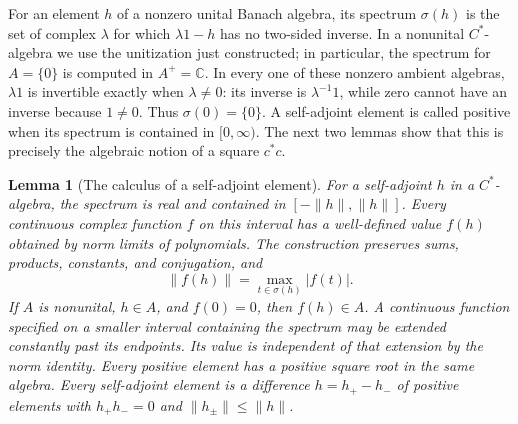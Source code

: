 \documentclass[11pt]{article}
\newtheorem{lemma}[theorem]{Lemma}
\theoremstyle{definition}
\theoremstyle{remark}
\numberwithin{equation}{section}
\newcommand{\C}{\mathbb C}
\begin{document}
For an element $h$ of a nonzero unital Banach algebra, its spectrum $\sigma(h)$
is the set of complex $\lambda$ for which $\lambda1-h$ has no two-sided
inverse.  In a nonunital $C^*$-algebra we use the unitization just constructed;
in particular, the spectrum for $A=\{0\}$ is computed in $A^+=\C$.
In every one of these nonzero ambient algebras, $\lambda1$ is invertible
exactly when $\lambda\ne0$: its inverse is $\lambda^{-1}1$, while zero
cannot have an inverse because $1\ne0$.  Thus $\sigma(0)=\{0\}$.
A self-adjoint element is called positive when its spectrum is contained in
$[0,\infty)$.  The next two lemmas show that this is precisely the algebraic
notion of a square $c^*c$.

\begin{lemma}[The calculus of a self-adjoint element]
\label{lem:cstar-calculus}
For a self-adjoint $h$ in a $C^*$-algebra, the spectrum is real and contained
in $[-\|h\|,\|h\|]$.  Every continuous complex function $f$ on this interval
has a well-defined value $f(h)$ obtained by norm limits of polynomials.
The construction preserves sums, products, constants, and conjugation, and
\[
 \|f(h)\|=\max_{t\in\sigma(h)}|f(t)|.
\]
If $A$ is nonunital, $h\in A$, and $f(0)=0$, then $f(h)\in A$.
A continuous function specified on a smaller interval containing the spectrum
may be extended constantly past its endpoints.  Its value is independent
of that extension by the norm identity.
Every positive element has a positive square root in the same algebra.
Every self-adjoint element is a difference $h=h_+-h_-$ of positive elements
with $h_+h_-=0$ and $\|h_\pm\|\leq\|h\|$.
\end{lemma}
\end{document}
